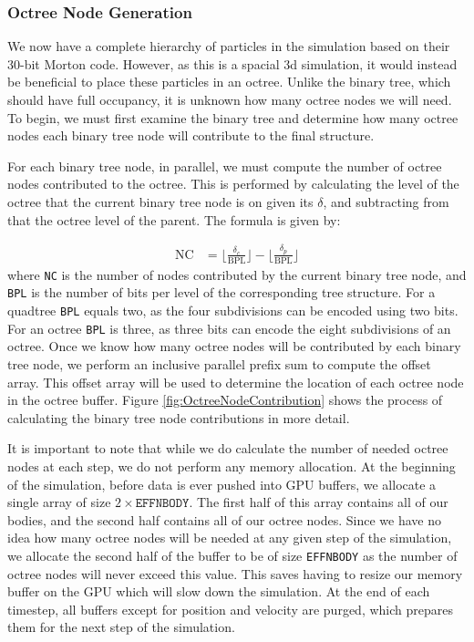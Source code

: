 \documentclass{thesis}
\begin{document}
\subsubsection{Octree Node Generation}
We now have a complete hierarchy of particles in the simulation based on their 30-bit  Morton code. However, as this is a spacial 3d simulation, it would instead be beneficial to place these particles in an octree. Unlike the binary tree, which should have full occupancy, it is unknown how many octree nodes we will need. To begin, we must first examine the binary tree and determine how many octree nodes each binary tree node will contribute to the final structure.

For each binary tree node, in parallel, we must compute the number of octree nodes contributed to the octree. This is performed by calculating the level of the octree that the current binary tree node is on given its $\delta$, and subtracting from that the octree level of the parent. The formula is given by:

\begin{align}
    \label{eq:NodeContributions}
    \text{NC} &= \lfloor\frac{\delta_c}{\text{BPL}}\rfloor - \lfloor\frac{\delta_p}{\text{BPL}}\rfloor
\end{align}
where \texttt{NC} is the number of nodes contributed by the current binary tree node, and \texttt{BPL} is the number of bits per level of the corresponding tree structure. For a quadtree \texttt{BPL} equals two, as the four subdivisions can be encoded using two bits. For an octree \texttt{BPL} is three, as three bits can encode the eight subdivisions of an octree. Once we know how many octree nodes will be contributed by each binary tree node, we perform an inclusive parallel prefix sum to compute the offset array. This offset array will be used to determine the location of each octree node in the octree buffer. Figure \ref{fig:OctreeNodeContribution} shows the process of calculating the binary tree node contributions in more detail.

It is important to note that while we do calculate the number of needed octree nodes at each step, we do not perform any memory allocation. At the beginning of the simulation, before data is ever pushed into GPU buffers, we allocate a single array of size $2\times \texttt{EFFNBODY}$. The first half of this array contains all of our bodies, and the second half contains all of our octree nodes. Since we have no idea how many octree nodes will be needed at any given step of the simulation, we allocate the second half of the buffer to be of size \texttt{EFFNBODY} as the number of octree nodes will never exceed this value. This saves having to resize our memory buffer on the GPU which will slow down the simulation. At the end of each timestep, all buffers except for position and velocity are purged, which prepares them for the next step of the simulation.
\end{document}
